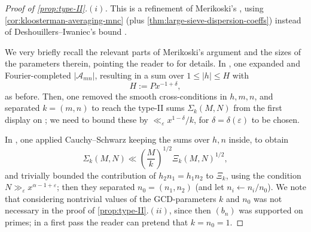 \documentclass[reqno,11pt]{amsart}
\theoremstyle{remark}
\numberwithin{equation}{section}
\newcommand{\mA}{\mathcal{A}}
\newcommand{\eps}{\varepsilon}
\begin{document}
\begin{proof}[Proof of \cref{prop:type-II}.$(i)$]
This is a refinement of Merikoski's \cite[Prop.\,4.(i)]{merikoski2023largest}, using \cref{cor:kloosterman-averaging-mnc} (plus \cref{thm:large-sieve-dispersion-coeffs}) instead of Deshouillers--Iwaniec's bound \cite[Theorem 9]{deshouillers1982kloosterman}. 

We very briefly recall the relevant parts of Merikoski's argument and the sizes of the parameters therein, pointing the reader to \cite[\S 3]{merikoski2023largest} for details. In \cite[\S 3.4]{merikoski2023largest}, one expanded and Fourier-completed $|\mA_{mn}|$, resulting in a sum over $1 \le |h| \le H$ with
\begin{equation} \label{eq:H-value}
    H := P x^{-1+\delta},
\end{equation}
as before. Then, one removed the smooth cross-conditions in $h, m, n$, and separated $k = (m, n)$ to reach the type-II sums $\Sigma_k(M, N)$ from the first display on \cite[p.\,1275]{merikoski2023largest}; we need to bound these by $\ll_\eps x^{1-\delta}/k$, for $\delta = \delta(\eps)$ to be chosen. 

In \cite[\S 3.5]{merikoski2023largest}, one applied Cauchy--Schwarz keeping the sums over $h, n$ inside, to obtain 
\begin{equation} \label{eq:sigma-k-cauchy}
    \Sigma_k(M, N) \ll \left(\frac{M}{k}\right)^{1/2} \Xi_k(M, N)^{1/2},
\end{equation}
and trivially bounded the contribution of $h_2 n_1 = h_1 n_2$ to $\Xi_k$, using the condition $N \gg_\eps x^{\alpha-1+\eps}$; then they separated $n_0 = (n_1, n_2)$ (and let $n_i \gets n_i/n_0$). We note that considering nontrivial values of the GCD-parameters $k$ and $n_0$ was not necessary in the proof of \cref{prop:type-II}.$(ii)$, since then $(b_n)$ was supported on primes; in a first pass the reader can pretend that $k = n_0 = 1$.


\end{proof}
\end{document}
